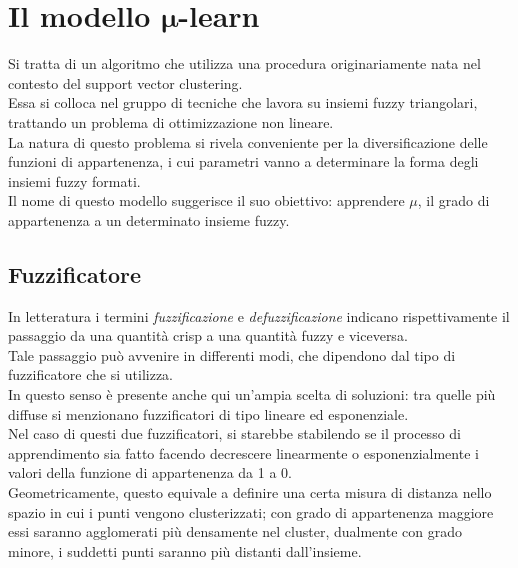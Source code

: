 \documentclass[12pt]{report}
\theoremstyle{definition}
\begin{document}
\section[\texorpdfstring{Il modello $\mu$-learn}%
                        {mu-learn}]%
        {Il modello $\bm{\mu}$-learn}  %
\label{mulearn}
Si tratta di un algoritmo che utilizza una procedura originariamente nata nel contesto del support vector clustering.
\\
Essa si colloca nel gruppo di tecniche che lavora su insiemi fuzzy triangolari, trattando un problema di ottimizzazione non lineare.
\\
La natura di questo problema si rivela conveniente per la diversificazione delle funzioni di appartenenza, i cui parametri vanno a determinare la forma degli insiemi fuzzy formati.
\\
Il nome di questo modello suggerisce il suo obiettivo: apprendere $\mu$, il grado di appartenenza a un determinato insieme fuzzy.

\subsection{Fuzzificatore} \label{fuzzificatore}
In letteratura i termini \textit{fuzzificazione} e \textit{defuzzificazione} indicano rispettivamente il passaggio da una quantità crisp a una quantità fuzzy e viceversa.
\\
Tale passaggio può avvenire in differenti modi, che dipendono dal tipo di fuzzificatore che si utilizza.
\\
In questo senso è presente anche qui un'ampia scelta di soluzioni: tra quelle più diffuse si menzionano fuzzificatori di tipo lineare ed esponenziale.
\\
Nel caso di questi due fuzzificatori, si starebbe stabilendo se il processo di apprendimento sia fatto facendo decrescere linearmente o esponenzialmente i valori della funzione di appartenenza da 1 a 0.
\\
Geometricamente, questo equivale a definire una certa misura di distanza nello spazio in cui i punti vengono clusterizzati; con grado di appartenenza maggiore essi saranno agglomerati più densamente nel cluster, dualmente con grado minore, i suddetti punti saranno più distanti dall'insieme.
\end{document}
